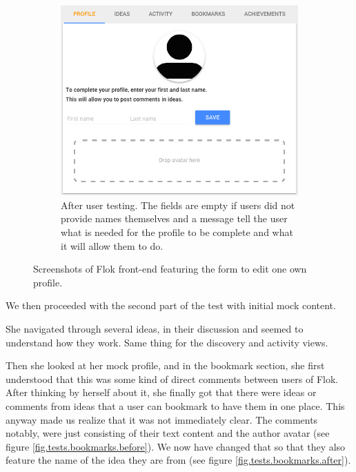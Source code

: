 \documentclass[a4paper,12pt, oneside]{article}
\begin{document}
\begin{figure}[!htb]
\begin{subfigure}[t]{.495\textwidth}
        \includegraphics[width=\textwidth]{images/user_tests/profileForm_after.png}
        \caption{After user testing. The fields are empty if users did not provide names themselves and a message tell the user what is needed for the profile to be complete and what it will allow them to do.}
        \label{fig.tests.profileForm.after}
    \end{subfigure}
    \caption{Screenshots of Flok front-end featuring the form to edit one own profile.}
    \label{fig.tests.profileForm}
\end{figure}

We then proceeded with the second part of the test with initial mock content.

She navigated through several ideas, in their discussion and seemed to understand how they work.
Same thing for the discovery and activity views.

Then she looked at her mock profile, and in the bookmark section, she first understood that this was some kind of direct comments between users of Flok.
After thinking by herself about it, she finally got that there were ideas or comments from ideas that a user can bookmark to have them in one place.
This anyway made us realize that it was not immediately clear.
The comments notably, were just consisting of their text content and the author avatar (see figure \ref{fig.tests.bookmarks.before}).
We now have changed that so that they also feature the name of the idea they are from (see figure \ref{fig.tests.bookmarks.after}).
\end{document}
